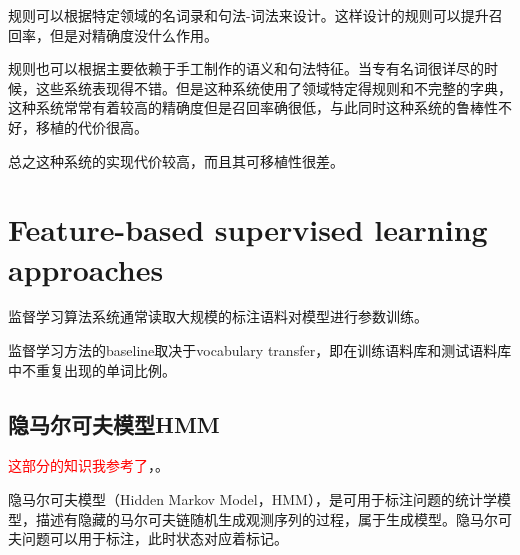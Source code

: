 \documentclass[a4paper,UTF8,no-math]{ctexart}
\begin{document}
	规则可以根据特定领域的名词录和句法-词法来设计。这样设计的规则可以提升召回率，但是对精确度没什么作用。
	
	规则也可以根据主要依赖于手工制作的语义和句法特征。当专有名词很详尽的时候，这些系统表现得不错。但是这种系统使用了领域特定得规则和不完整的字典，这种系统常常有着较高的精确度但是召回率确很低，与此同时这种系统的鲁棒性不好，移植的代价很高。
	
	总之这种系统的实现代价较高，而且其可移植性很差。
	
%	
%	
%	
%	
	
	
	\section{Feature-based supervised learning approaches}
	
	监督学习算法系统通常读取大规模的标注语料对模型进行参数训练。
	
	监督学习方法的baseline取决于vocabulary transfer，即在训练语料库和测试语料库中不重复出现的单词比例。
	
	\subsection{隐马尔可夫模型HMM}
	
	
	
	\textcolor{red}{这部分的知识我参考了}\citep{李航2012统计学习方法}，\citep{宗成庆2013统计自然语言处理}。

	
	隐马尔可夫模型（Hidden Markov Model，HMM），是可用于标注问题的统计学模型，描述有隐藏的马尔可夫链随机生成观测序列的过程，属于生成模型。隐马尔可夫问题可以用于标注，此时状态对应着标记。
	
\end{document}
